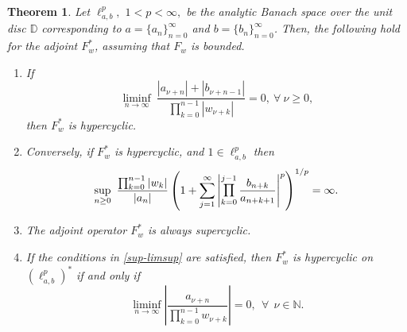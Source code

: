 \documentclass[12pt, reqno]{amsart}
\DeclareMathOperator*{\Mprod}{\text{\raisebox{0.25ex}{\scalebox{0.8}{$\prod$}}}}
\newtheorem{theorem}{Theorem}[section]
\theoremstyle{definition}
\theoremstyle{remark}
\numberwithin{equation}{section}
\begin{document}
\begin{theorem}\label{unilateral}
     Let $\ell^{p}_{a,b},$ $1< p<\infty,$ be the analytic Banach space over the unit disc $\mathbb{D}$ corresponding to $a=\{a_n\}_{n=0}^{\infty}$ and $b=\{b_n\}_{n=0}^{\infty}$. Then, the following hold for the adjoint $F_{w}^{*}$, assuming that $F_w$ is bounded.
\begin{enumerate}
\item[(i)] If
\begin{equation}\label{hypercyclic3}
\liminf_{n\rightarrow \infty} ~ \frac{|a_{\nu+n}|+|b_{\nu+n-1}|} {\prod_{k=0}^{n-1}|w_{\nu+k}|}=0,~\forall~\nu\geq 0,
\end{equation}
then $F_w^*$ is hypercyclic.
\item[(ii)] Conversely, if $F_w^*$ is hypercyclic, and $1\in \ell^p_{a,b}$ then
\[
\sup_{n\geq 0} ~\frac{\prod_{k=0}^{n-1}|w_k|}{|a_{n}|} \left (1+\sum_{j=1}^{\infty}\left|\Mprod_{k=0}^{j-1}\frac{b_{n+k}}{a_{n+k+1}}\right|^p\right)^{1/p}=\infty.
\]

\item[(iii)] The adjoint operator $F_w^*$ is always supercyclic.
\item[(iv)] If the conditions in \eqref{sup-limsup} are satisfied, then $F_{w}^{*}$ is hypercyclic on $(\ell^{p}_{a,b})^{*}$ if and only if 
         \begin{equation}\label{iff hyper}
               \liminf_{n\rightarrow \infty} \left| \frac{a_{\nu+n }}{\prod_{k=0}^{n-1} w_{\nu+k}}\right|=0,~~ \forall~~ \nu\in \mathbb{N}.
        \end{equation}
         \end{enumerate}
\end{theorem}
\end{document}
